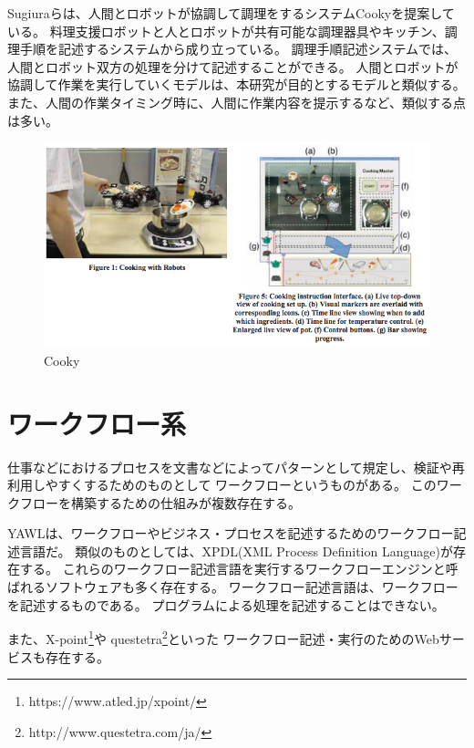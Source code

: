 Sugiuraらは、人間とロボットが協調して調理をするシステムCooky\cite{cooky}を提案している。
料理支援ロボットと人とロボットが共有可能な調理器具やキッチン、調理手順を記述するシステムから成り立っている。
調理手順記述システムでは、人間とロボット双方の処理を分けて記述することができる。
人間とロボットが協調して作業を実行していくモデルは、本研究が目的とするモデルと類似する。
また、人間の作業タイミング時に、人間に作業内容を提示するなど、類似する点は多い。

\begin{figure}[htbp]
  \begin{center}
  \includegraphics[width=.6\linewidth,bb=0 0 633 336]{images/cooky.png}
  \end{center}
  \caption{Cooky}
  \label{fig:cooky}
\end{figure}

\section{ワークフロー系}\label{ux30efux30fcux30afux30d5ux30edux30fcux7cfb}

仕事などにおけるプロセスを文書などによってパターンとして規定し、検証や再利用しやすくするためのものとして
ワークフローというものがある。
このワークフローを構築するための仕組みが複数存在する。

YAWL\cite{yawl}は、ワークフローやビジネス・プロセスを記述するためのワークフロー記述言語だ。
類似のものとしては、XPDL(XML Process Definition
Language)\cite{xpdl}が存在する。
これらのワークフロー記述言語を実行するワークフローエンジンと呼ばれるソフトウェアも多く存在する。
ワークフロー記述言語は、ワークフローを記述するものである。
プログラムによる処理を記述することはできない。

また、X-point\footnote{https://www.atled.jp/xpoint/}や
questetra\footnote{http://www.questetra.com/ja/}といった
ワークフロー記述・実行のためのWebサービスも存在する。

